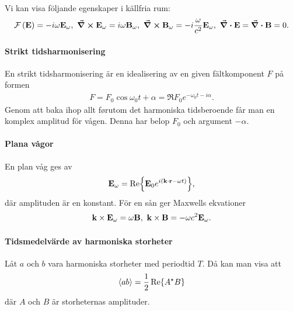 Vi kan visa följande egenskaper i källfria rum:
\begin{align*}
	\mathcal{F}\left(\vb{E}\right) = -i\omega\vb{E}_{\omega},\ \curl{\vb{E}_{\omega}} = i\omega\vb{B}_{\omega},\ \curl{\vb{B}_{\omega}} = -i\frac{\omega}{c^{2}}\vb{E}_{\omega},\ \div{\vb{E}} = \div{\vb{B}} = 0.
\end{align*}

\paragraph{Strikt tidsharmonisering}
En strikt tidsharmonisering är en idealisering av en given fältkomponent $F$ på formen
\begin{align*}
	F = F_{0}\cos{\omega_{0}t + \alpha} = \Re{F_{0}e^{-\omega_{0}t - i\alpha}}.
\end{align*}
Genom att baka ihop allt førutom det harmoniska tidsberoende får man en komplex amplitud för vågen. Denna har belop $F_{0}$ och argument $-\alpha$.

\paragraph{Plana vågor}
En plan våg ges av
\begin{align*}
	\vb{E}_{\omega} = \Re{\vb{E}_{0}e^{i(\vb{k}\cdot\vb{r} - \omega t)}},
\end{align*}
där amplituden är en konstant. För en sån ger Maxwells ekvationer
\begin{align*}
	\vb{k}\times\vb{E}_{\omega} = \omega\vb{B},\ \vb{k}\times\vb{B} = -\omega c^{2}\vb{E}_{\omega}.
\end{align*}

\paragraph{Tidsmedelvärde av harmoniska storheter}
Låt $a$ och $b$ vara harmoniska storheter med periodtid $T$. Då kan man visa att
\begin{align*}
	\expval{ab} = \frac{1}{2}\Re{A^{\star}B}
\end{align*}
där $A$ och $B$ är storheternas amplituder.


